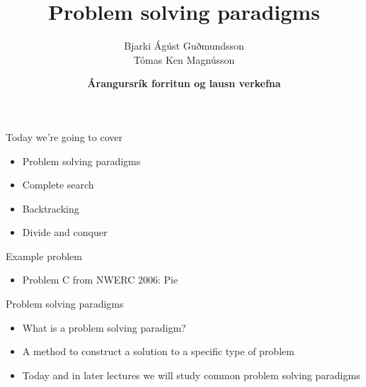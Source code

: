 \documentclass[10pt]{beamer}
\title{Problem solving paradigms}
\author{Bjarki Ágúst Guðmundsson\\ Tómas Ken Magnússon}
\institute{\href{http://ru.is/td}{School of Computer Science} \\[2pt] \href{http://ru.is}{Reykjavík University}}
\date{\textbf{Árangursrík forritun og lausn verkefna}}
\newcommand{\bi}{\begin{itemize}}
\newcommand{\ei}{\end{itemize}}
\begin{document}
\maketitle


\begin{frame}{Today we're going to cover}
    \bi
        \item Problem solving paradigms
        \item Complete search
        \item Backtracking
        \item Divide and conquer
    \ei
\end{frame}

\begin{frame}{Example problem}
    \bi
        \item Problem C from NWERC 2006: Pie
    \ei
\end{frame}

\begin{frame}{Problem solving paradigms}
    \bi
        \item What is a problem solving paradigm?
        \item A method to construct a solution to a specific type of problem
        \item Today and in later lectures we will study common problem solving paradigms
    \ei
\end{frame}
\end{document}
